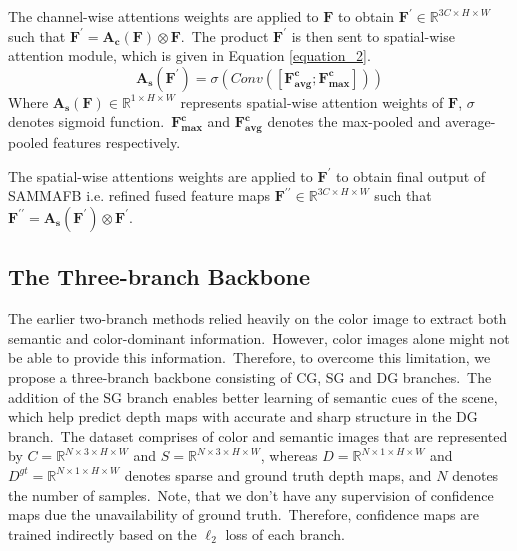 \documentclass{ieeeaccess}
\begin{document}
The channel-wise attentions weights are applied to $\mathbf{F}$ to obtain $\mathbf{F^{\prime}} \in \mathbb{R}^{3C \times H \times W}$ such that $\mathbf{F^{\prime}} = \mathbf{A_{c}(F)} \otimes \mathbf{F}$.~The product $\mathbf{F^{\prime}}$ is then sent to spatial-wise attention module, which is given in Equation \ref{equation_2}.
\begin{equation}
\mathbf{A_{s}}\left(\mathbf{F^{\prime}}\right)=\sigma\left(Conv\left(\left[\mathbf{F_{avg}^{c}} ; \mathbf{F_{max}^{c}}\right]\right)\right)
\label{equation_2}
\end{equation}
Where $\mathbf{{A}_s(F)} \in \mathbb{R}^{1 \times H \times W}$ represents spatial-wise attention weights of $\mathbf{F}$, $\sigma$ denotes sigmoid function.~$\mathbf{F_{max}^{c}}$ and $\mathbf{F_{avg}^{c}}$  denotes the max-pooled and average-pooled features respectively. 

The spatial-wise attentions weights are applied to $\mathbf{F^{\prime}}$ to obtain final output of SAMMAFB i.e. refined fused feature maps $\mathbf{F^{\prime\prime}} \in \mathbb{R}^{3C \times H \times W}$ such that $\mathbf{F^{\prime\prime}} = \mathbf{A_{s}}(\mathbf{F^{\prime}}) \otimes \mathbf{F^{\prime}}$.


\subsection{The Three-branch Backbone}
The earlier two-branch methods \cite{hu2020PENet,yan2021rignet,zhao2021adaptive,liu2021fcfr} relied heavily on the color image to extract both semantic and color-dominant information.~However, color images alone might not be able to provide this information.~Therefore, to overcome this limitation, we propose a three-branch backbone consisting of CG, SG and DG branches.~The addition of the SG branch enables better learning of semantic cues of the scene, which help predict depth maps with accurate and sharp structure in the DG branch.~The dataset comprises of color and semantic images that are represented by $C = \mathbb{R}^{N \times 3 \times H \times W}$ and $S=\mathbb{R}^{N \times 3 \times H \times W}$, whereas $ D=\mathbb{R}^{N \times 1 \times H \times W}$ and $D^{gt} = \mathbb{R}^{N \times 1 \times H \times W}$ denotes sparse and ground truth depth maps, and $N$ denotes the number of samples.~Note, that we don't have any supervision of confidence maps due the unavailability of ground truth.~Therefore, confidence maps are trained indirectly based on the $\ell_2$ loss of each branch. 
\end{document}
